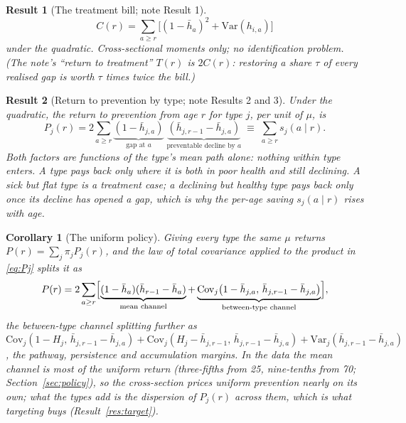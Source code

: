 \documentclass[11pt]{article}
\newtheorem{result}{Result}
\newtheorem{corollary}{Corollary}
\newcommand{\Var}{\mathrm{Var}}
\newcommand{\Cov}{\mathrm{Cov}}
\begin{document}
	\begin{result}[The treatment bill; note Result 1]\label{res:treat}
		$$
		C(r)=\sum_{a\ge r}\bigl[(1-\bar h_a)^2+\Var(h_{i,a})\bigr]
		$$
		under the quadratic. Cross-sectional moments only; no identification problem. (The note's ``return to treatment'' $T(r)$ is $2C(r)$: restoring a share $\tau$ of every realised gap is worth $\tau$ times twice the bill.)
	\end{result}
	
	\begin{result}[Return to prevention by type; note Results 2 and 3]\label{res:prev}
		Under the quadratic, the return to prevention from age $r$ for type $j$, per unit of $\mu$, is
		\begin{equation}
			P_j(r)=2\sum_{a\ge r}\underbrace{(1-\bar h_{j,a})}_{\text{gap at }a}\;\underbrace{(\bar h_{j,r-1}-\bar h_{j,a})}_{\text{preventable decline by }a}\;\equiv\;\sum_{a\ge r}s_j(a\mid r).
			\label{eq:Pj}
		\end{equation}
		Both factors are functions of the type's mean path alone: nothing within type enters. A type pays back only where it is \emph{both} in poor health and still declining. A sick but flat type is a treatment case; a declining but healthy type pays back only once its decline has opened a gap, which is why the per-age saving $s_j(a\mid r)$ rises with age.
	\end{result}

	\begin{corollary}[The uniform policy]\label{cor:uniform}
		Giving every type the same $\mu$ returns $P(r)=\sum_j\pi_jP_j(r)$, and the law of total covariance applied to the product in \eqref{eq:Pj} splits it as
		\begin{equation}
			P(r)=2\sum_{a\ge r}\Bigl[\underbrace{(1-\bar h_a)(\bar h_{r-1}-\bar h_a)}_{\text{mean channel}}
			+\underbrace{\Cov_j\bigl(1-\bar h_{j,a},\,\bar h_{j,r-1}-\bar h_{j,a}\bigr)}_{\text{between-type channel}}\Bigr],
			\label{eq:P}
		\end{equation}
		the between-type channel splitting further as $\Cov_j(1-H_j,\,\bar h_{j,r-1}-\bar h_{j,a})+\Cov_j(H_j-\bar h_{j,r-1},\,\bar h_{j,r-1}-\bar h_{j,a})+\Var_j(\bar h_{j,r-1}-\bar h_{j,a})$, the pathway, persistence and accumulation margins. In the data the mean channel is most of the uniform return (three-fifths from 25, nine-tenths from 70; Section~\ref{sec:policy}), so the cross-section prices uniform prevention nearly on its own; what the types add is the dispersion of $P_j(r)$ across them, which is what targeting buys (Result~\ref{res:target}).
	\end{corollary}
\end{document}
